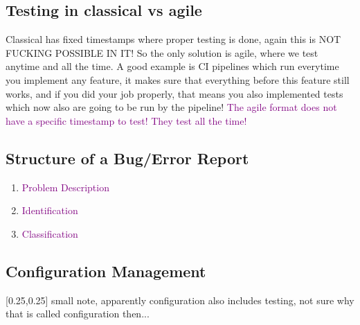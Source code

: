 \documentclass[main.tex,fontsize=12pt,paper=a4,paper=landscape,DIV=calc,]{scrartcl}
\begin{document}
\begin{multicols*}{2}
\subsection{Testing in classical vs agile}
Classical has fixed timestamps where proper testing is done, again this is NOT FUCKING POSSIBLE IN IT!\newline
So the only solution is agile, where we test anytime and all the time.\newline
A good example is CI pipelines which run everytime you implement any feature, it makes sure that everything before this feature still works, and if you did your job properly, that means you also implemented tests which now also are going to be run by the pipeline!\newline
\textcolor{purple}{The agile format does not have a specific timestamp to test! They test all the time!}

\subsection{Structure of a Bug/Error Report}
\begin{enumerate}
\item \textcolor{purple}{Problem Description}
\item \textcolor{purple}{Identification}
\item \textcolor{purple}{Classification}
\end{enumerate} 

\subsection{Configuration Management}
[0.25,0.25]
small note, apparently configuration also includes testing, not sure why that is called configuration then...


\end{multicols*}
\end{document}
